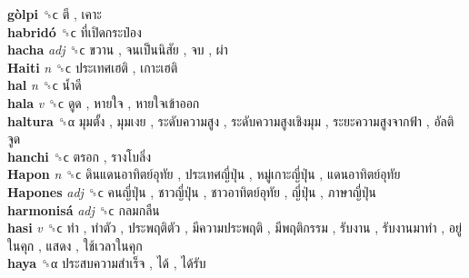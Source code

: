 \textbf{gòlpi} ␝ϲ   ตี ,  เคาะ   \\
\textbf{habridó} ␝ϲ   ที่เปิดกระป๋อง   \\
\textbf{hacha} \emph{adj}  ␝ϲ   ขวาน ,  จนเป็นนิสัย ,  จบ ,  ผ่า   \\
\textbf{Haiti} \emph{n}  ␝ϲ   ประเทศเฮติ ,  เกาะเฮติ   \\
\textbf{hal} \emph{n}  ␝ϲ   น้ำดี   \\
\textbf{hala} \emph{v}  ␝ϲ   ดูด ,  หายใจ ,  หายใจเข้าออก   \\
\textbf{haltura} ␝α   มุมตั้ง ,  มุมเงย ,  ระดับความสูง ,  ระดับความสูงเชิงมุม ,  ระยะความสูงจากฟ้า ,  อัลติจูด   \\
\textbf{hanchi} ␝ϲ   ตรอก ,  รางโบลิ่ง   \\
\textbf{Hapon} \emph{n}  ␝ϲ   ดินแดนอาทิตย์อุทัย ,  ประเทศญี่ปุ่น ,  หมู่เกาะญี่ปุ่น ,  แดนอาทิตย์อุทัย   \\
\textbf{Hapones} \emph{adj}  ␝ϲ   คนญี่ปุ่น ,  ชาวญี่ปุ่น ,  ชาวอาทิตย์อุทัย ,  ญี่ปุ่น ,  ภาษาญี่ปุ่น   \\
\textbf{harmonisá} \emph{adj}  ␝ϲ   กลมกลืน   \\
\textbf{hasi} \emph{v}  ␝ϲ   ทำ ,  ทำตัว ,  ประพฤติตัว ,  มีความประพฤติ ,  มีพฤติกรรม ,  รับงาน ,  รับงานมาทำ ,  อยู่ในคุก ,  แสดง ,  ใช้เวลาในคุก   \\
\textbf{haya} ␝α   ประสบความสำเร็จ ,  ได้ ,  ได้รับ   \\
